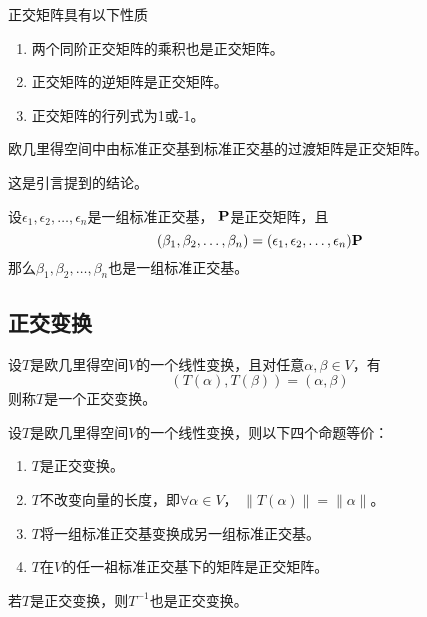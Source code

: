 \begin{theorem}[正交矩阵的性质]
  正交矩阵具有以下性质
  \begin{enumerate}
    \item
    两个同阶正交矩阵的乘积也是正交矩阵。
    \item
    正交矩阵的逆矩阵是正交矩阵。
    \item
    正交矩阵的行列式为1或-1。
  \end{enumerate}
\end{theorem}

\begin{theorem}
  欧几里得空间中由标准正交基到标准正交基的过渡矩阵是正交矩阵。
\end{theorem}

\begin{remark}
  这是引言提到的结论。
\end{remark}

\begin{theorem}
  设$\epsilon_1,\epsilon_2,\dots,\epsilon_n$是一组标准正交基，
  $\mathbf{P}$是正交矩阵，且
  \begin{displaymath}
    (\beta_1,\beta_2,\dots,\beta_n) =
      (\epsilon_1,\epsilon_2,\dots,\epsilon_n)\mathbf{P}
  \end{displaymath}
  那么$\beta_1,\beta_2,\dots,\beta_n$也是一组标准正交基。
\end{theorem}

\subsection{正交变换}
\begin{definition}[正交变换]
  设$T$是欧几里得空间$V$的一个线性变换，且对任意$\alpha,\beta\in V$，有
  \begin{displaymath}
    (T(\alpha), T(\beta)) = (\alpha,\beta)
  \end{displaymath}
  则称$T$是一个正交变换。
\end{definition}

\begin{theorem}[正交变换的等价条件]
  设$T$是欧几里得空间$V$的一个线性变换，则以下四个命题等价：
  \begin{enumerate}
    \item
    $T$是正交变换。
    \item
    $T$不改变向量的长度，即$\forall\alpha\in V$，
    $\|T(\alpha)\|=\|\alpha\|$。
    \item
    $T$将一组标准正交基变换成另一组标准正交基。
    \item
    $T$在$V$的任一祖标准正交基下的矩阵是正交矩阵。
  \end{enumerate}
\end{theorem}

\begin{theorem}
  若$T$是正交变换，则$T^{-1}$也是正交变换。
\end{theorem}
